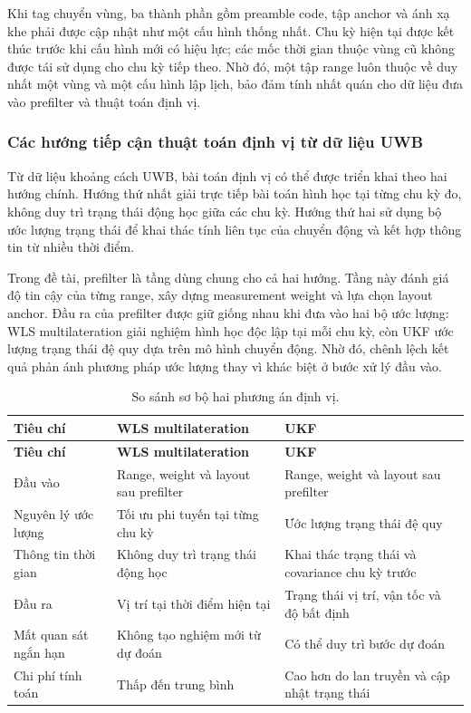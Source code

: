 \documentclass[
  a4paper,
]{report}
\begin{document}
Khi tag chuyển vùng, ba thành phần gồm preamble code, tập anchor và ánh xạ khe
phải được cập nhật như một cấu hình thống nhất. Chu kỳ hiện tại được kết thúc
trước khi cấu hình mới có hiệu lực; các mốc thời gian thuộc vùng cũ không được
tái sử dụng cho chu kỳ tiếp theo. Nhờ đó, một tập range luôn thuộc về duy nhất
một vùng và một cấu hình lập lịch, bảo đảm tính nhất quán cho dữ liệu đưa vào
prefilter và thuật toán định vị.

\subsubsection{Các hướng tiếp cận thuật toán định vị từ dữ liệu UWB}

Từ dữ liệu khoảng cách UWB, bài toán định vị có thể được triển khai theo hai
hướng chính. Hướng thứ nhất giải trực tiếp bài toán hình học tại từng chu kỳ
đo, không duy trì trạng thái động học giữa các chu kỳ. Hướng thứ hai sử dụng
bộ ước lượng trạng thái để khai thác tính liên tục của chuyển động và kết hợp
thông tin từ nhiều thời điểm.

Trong đề tài, prefilter là tầng dùng chung cho cả hai hướng. Tầng này đánh giá
độ tin cậy của từng range, xây dựng measurement weight và lựa chọn layout
anchor. Đầu ra của prefilter được giữ giống nhau khi đưa vào hai bộ ước lượng:
WLS multilateration giải nghiệm hình học độc lập tại mỗi chu kỳ, còn UKF ước
lượng trạng thái đệ quy dựa trên mô hình chuyển động. Nhờ đó, chênh lệch kết
quả phản ánh phương pháp ước lượng thay vì khác biệt ở bước xử lý đầu vào.

\begin{longtable}{@{}p{}p{}p{}@{}}
\caption{So sánh sơ bộ hai phương án định vị.}
\label{tab:wls-ukf-comparison}\\
\toprule
\textbf{Tiêu chí} & \textbf{WLS multilateration} &
\textbf{UKF} \\
\midrule
\endfirsthead
\toprule
\textbf{Tiêu chí} & \textbf{WLS multilateration} &
\textbf{UKF} \\
\midrule
\endhead
Đầu vào & Range, weight và layout sau prefilter &
Range, weight và layout sau prefilter \\
Nguyên lý ước lượng & Tối ưu phi tuyến tại từng chu kỳ &
Ước lượng trạng thái đệ quy \\
Thông tin thời gian & Không duy trì trạng thái động học &
Khai thác trạng thái và covariance chu kỳ trước \\
Đầu ra & Vị trí tại thời điểm hiện tại &
Trạng thái vị trí, vận tốc và độ bất định \\
Mất quan sát ngắn hạn & Không tạo nghiệm mới từ dự đoán &
Có thể duy trì bước dự đoán \\
Chi phí tính toán & Thấp đến trung bình &
Cao hơn do lan truyền và cập nhật trạng thái \\
\bottomrule
\end{longtable}
\end{document}
